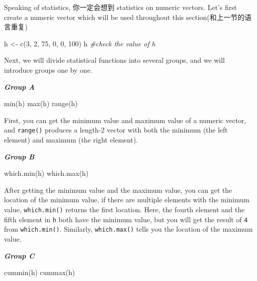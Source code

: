 \documentclass[
]{book}
\newenvironment{Shaded}{\begin{snugshade}}{\end{snugshade}}
\newcommand{\CommentTok}[1]{\textcolor[rgb]{0.56,0.35,0.01}{\textit{#1}}}
\newcommand{\DecValTok}[1]{\textcolor[rgb]{0.00,0.00,0.81}{#1}}
\newcommand{\FunctionTok}[1]{\textcolor[rgb]{0.00,0.00,0.00}{#1}}
\newcommand{\NormalTok}[1]{#1}
\newcommand{\OtherTok}[1]{\textcolor[rgb]{0.56,0.35,0.01}{#1}}
\begin{document}
Speaking of statistics, 你一定会想到 statistics on numeric vectors. Let's first create a numeric vector which will be used throughout this section(和上一节的语言重复)

\begin{Shaded}
\begin{Highlighting}[]
\NormalTok{h }\OtherTok{\textless{}{-}} \FunctionTok{c}\NormalTok{(}\DecValTok{3}\NormalTok{, }\DecValTok{2}\NormalTok{, }\DecValTok{75}\NormalTok{, }\DecValTok{0}\NormalTok{, }\DecValTok{0}\NormalTok{, }\DecValTok{100}\NormalTok{)}
\NormalTok{h }\CommentTok{\#check the value of h}
\end{Highlighting}
\end{Shaded}

Next, we will divide statistical functions into several groups, and we will introduce groups one by one.

\textbf{\emph{Group A}}

\begin{Shaded}
\begin{Highlighting}[]
\FunctionTok{min}\NormalTok{(h) }
\FunctionTok{max}\NormalTok{(h) }
\FunctionTok{range}\NormalTok{(h)}
\end{Highlighting}
\end{Shaded}

First, you can get the minimum value and maximum value of a numeric vector, and \texttt{range()} produces a length-2 vector with both the minimum (the left element) and maximum (the right element).

\textbf{\emph{Group B}}

\begin{Shaded}
\begin{Highlighting}[]
\FunctionTok{which.min}\NormalTok{(h) }
\FunctionTok{which.max}\NormalTok{(h) }
\end{Highlighting}
\end{Shaded}

After getting the minimum value and the maximum value, you can get the location of the minimum value, if there are multiple elements with the minimum value, \texttt{which.min()} returns the first location. Here, the fourth element and the fifth element in \texttt{h} both have the minimum value, but you will get the result of \texttt{4} from \texttt{which.min()}. Similarly, \texttt{which.max()} tells you the location of the maximum value.

\textbf{\emph{Group C}}

\begin{Shaded}
\begin{Highlighting}[]
\FunctionTok{cummin}\NormalTok{(h) }
\FunctionTok{cummax}\NormalTok{(h) }
\end{Highlighting}
\end{Shaded}
\end{document}

